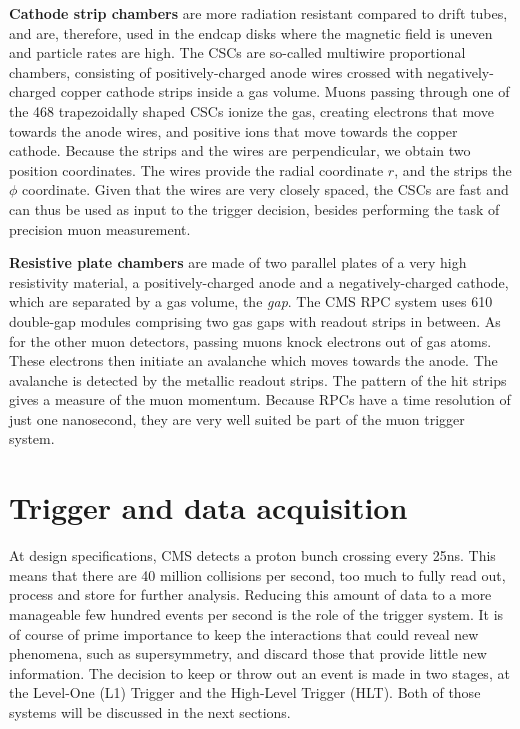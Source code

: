 \textbf{Cathode strip chambers} are more radiation resistant compared to drift tubes, and are,
therefore, used in the endcap disks where the magnetic field is uneven and particle rates are high. 
The CSCs are so-called multiwire proportional chambers, consisting of positively-charged anode wires
crossed with negatively-charged copper cathode strips inside a gas volume. Muons passing through
one of the 468 trapezoidally shaped CSCs ionize the gas, creating electrons that move
towards the anode wires, and positive ions that move towards the copper cathode. 
Because the strips and the wires are perpendicular, we obtain two position coordinates. The
wires provide the radial coordinate $r$, and the strips the $\phi$ coordinate. 
Given that the wires are very closely spaced, the CSCs are fast and can thus be used as input to the
trigger decision, besides performing the task of precision muon measurement. 

\textbf{Resistive plate chambers} are made of two parallel plates of a very high resistivity
material, a positively-charged anode and a negatively-charged cathode, which are separated by a gas
volume, the \textit{gap}. The CMS RPC system uses 610 double-gap modules comprising two gas gaps
with readout strips in between. 
As for the other muon detectors, passing muons knock electrons out of gas atoms. These electrons
then initiate an avalanche which moves towards the anode. The avalanche is detected by the metallic
readout strips. The pattern of the hit strips gives a measure of the muon momentum. Because RPCs
have a time resolution of just one nanosecond, they are very well suited be part of the muon trigger
system. 



\section{Trigger and data acquisition \label{sec:cms_tdaq}}

At design specifications, CMS detects a proton bunch crossing every 25\unit{ns}. This means that
there are 40 million collisions per second, too much to fully read out, process and store for
further analysis. Reducing this amount of data to a more manageable few hundred events
per second is the role of the trigger system. It is of course of prime importance to keep the
interactions that could reveal new phenomena, such as supersymmetry, and discard those that provide
little new information. 
The decision to keep or throw out an event is made in two stages, at the Level-One (L1) Trigger and
the High-Level Trigger (HLT). Both of those systems will be discussed in the next sections. 

